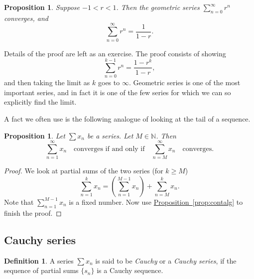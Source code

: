 \documentclass[12pt]{book}
\newcommand{\N}{{\mathbb{N}}}
\newcommand{\myindex}[1]{#1\index{#1}}
\theoremstyle{plain}
\newtheorem{prop}[thm]{Proposition}
\theoremstyle{remark}
\theoremstyle{definition}
\newtheorem{defn}[thm]{Definition}
\theoremstyle{exercise}
\theoremstyle{example}
\newcommand{\propref}[1]{\hyperref[#1]{Proposition~\ref*{#1}}}
\begin{document}
\begin{prop} \label{geometric:prop}
Suppose
$-1 < r < 1$.  Then the \emph{\myindex{geometric series}}
$\sum_{n=0}^\infty r^n$ converges, and
\begin{equation*}
\sum_{n=0}^\infty r^n = \frac{1}{1-r} .
\end{equation*}
\end{prop}

Details of the proof are left as an exercise.
The proof consists of showing 
\begin{equation*}
\sum_{n=0}^{k-1} r^n = \frac{1-r^k}{1-r} ,
\end{equation*}
and then taking the limit as $k$ goes to $\infty$.
Geometric series is one of the most important series, and in fact it is
one of the few series for which we can so explicitly find the limit.

\medskip

A fact we often use is the following analogue of looking at the tail of
a sequence.

\begin{prop}
Let $\sum x_n$ be a series.  Let $M \in \N$.  Then
\begin{equation*}
\sum_{n=1}^\infty x_n \quad \text{converges if and only if} \quad
\sum_{n=M}^\infty x_n \quad \text{converges.}
\end{equation*}
\end{prop}

\begin{proof}
We look at partial sums of the two series (for $k \geq M$)
\begin{equation*}
\sum_{n=1}^{k} x_n
=
\left(
\sum_{n=1}^{M-1} x_n
\right)
+
\sum_{n=M}^{k} x_n .
\end{equation*}
Note that 
$\sum_{n=1}^{M-1} x_n$ is a fixed number.  Now use
\propref{prop:contalg} to finish the proof.
\end{proof}

\subsection{Cauchy series}

\begin{defn}
A series $\sum x_n$ is said to be \emph{Cauchy} or a
\emph{Cauchy series},
if the sequence of partial sums $\{ s_n \}$ is a Cauchy sequence.
\end{defn}
\end{document}
